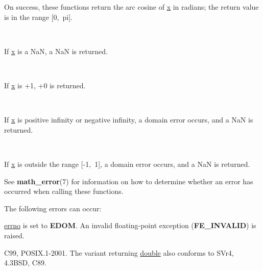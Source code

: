 \documentclass[]{article}
\let\realtextbf=\textbf
\renewcommand{\textbf}[1]{\textcolor{boldcolor}{\realtextbf{#1}}}
\renewcommand{\emph}[1]{\underline{#1}}
\begin{document}

On success, these functions return the arc cosine of \emph{x} in
radians; the return value is in the range {[}0,~pi{]}.

~

If \emph{x} is a NaN, a NaN is returned.

~

If \emph{x} is +1, +0 is returned.

~

If \emph{x} is positive infinity or negative infinity, a domain error
occurs, and a NaN is returned.

~

If \emph{x} is outside the range {[}-1,~1{]}, a domain error occurs, and
a NaN is returned.


See \textbf{math\_error}(7) for information on how to determine whether
an error has occurred when calling these functions.

The following errors can occur:

\begin{description}
\itemsep1pt\parskip0pt
\item[Domain error: \emph{x} is outside the range {[}-1,~1{]}]
\emph{errno} is set to \textbf{EDOM}. An invalid floating-point
exception (\textbf{FE\_INVALID}) is raised.
\end{description}


C99, POSIX.1-2001. The variant returning \emph{double} also conforms to
SVr4, 4.3BSD, C89.

\end{document}

